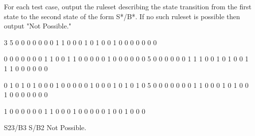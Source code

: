 \begin{formalout}
For each test case, output the ruleset describing the state transition from the first state to the second state of the form S*/B*. If no such ruleset is possible then output "Not Possible."
\end{formalout}

\begin{datain}
3
5
0 0 0 0 0
0 0 1 1 0
0 0 1 0 1
0 0 1 0 0
0 0 0 0 0

0 0 0 0 0
0 0 1 1 0
0 1 1 0 0
0 0 0 1 0
0 0 0 0 0
5
0 0 0 0 0
0 1 1 1 0
0 1 0 1 0
0 1 1 1 0
0 0 0 0 0

0 1 0 1 0
1 0 0 0 1
0 0 0 0 0
1 0 0 0 1
0 1 0 1 0
5
0 0 0 0 0
0 0 1 1 0
0 0 1 0 1
0 0 1 0 0
0 0 0 0 0

1 0 0 0 0
0 0 1 1 0
0 0 1 0 0
0 0 0 1 0
0 1 0 0 0
\end{datain}

\begin{dataout}
S23/B3
S/B2
Not Possible.
\end{dataout}

